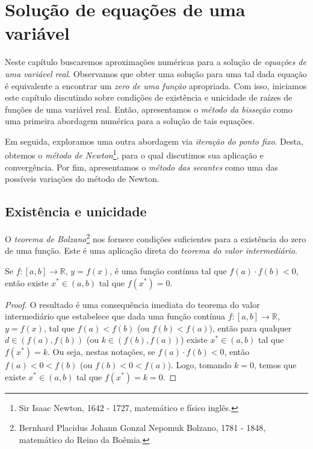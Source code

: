 
%

\chapter{Solução de equações de uma variável}

Neste capítulo buscaremos aproximações numéricas para a solução de \emph{equações de uma variável real}. Observamos que obter uma solução para uma tal dada equação é equivalente a encontrar um \emph{zero de uma função} apropriada. Com isso, iniciamos este capítulo discutindo sobre condições de existência e unicidade de raízes de funções de uma variável real. Então, apresentamos o \emph{método da bisseção} como uma primeira abordagem numérica para a solução de tais equações.

Em seguida, exploramos uma outra abordagem via \emph{iteração do ponto fixo}. Desta, obtemos o \emph{método de Newton}\footnote{Sir Isaac Newton, 1642 - 1727, matemático e físico inglês.}, para o qual discutimos sua aplicação e convergência. Por fim, apresentamos o \emph{método das secantes} como uma das possíveis variações do método de Newton.

\section{Existência e unicidade}

O \emph{teorema de Bolzano}\footnote{Bernhard Placidus Johann Gonzal Nepomuk Bolzano, 1781 - 1848, matemático do Reino da Boêmia.} nos fornece condições suficientes para a existência do zero de uma função. Este é uma aplicação direta do \emph{teorema do valor intermediário}.

\begin{teo}\label{teo:teorema_de_Bolzano}
  Se $f:[a, b]\to\mathbb{R}$, $y = f(x)$, é uma função contínua tal que $f(a)\cdot f(b) < 0$, então existe $x^*\in (a, b)$ tal que $f(x^*) = 0$.
\end{teo}
\begin{proof}
  O resultado é uma consequência imediata do teorema do valor intermediário que estabelece que dada uma função contínua $f:[a, b]\to\mathbb{R}$, $y = f(x)$, tal que $f(a) < f(b)$ (ou $f(b) < f(a)$), então para qualquer $d\in \left(f(a), f(b)\right)$ (ou $k\in \left(f(b), f(a)\right)$) existe $x^*\in (a, b)$ tal que $f(x^*) = k$. Ou seja, nestas notações, se $f(a)\cdot f(b) < 0$, então $f(a) < 0 < f(b)$ (ou $f(b) < 0 < f(a)$). Logo, tomando $k = 0$, temos que existe $x^*\in (a, b)$ tal que $f(x^*) = k = 0$.
\end{proof}

